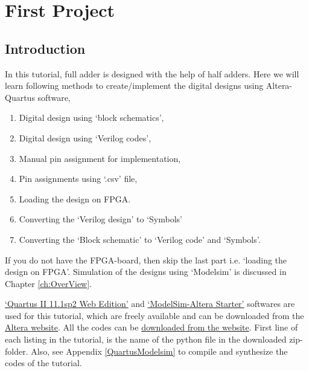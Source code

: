 \chapter{First Project} \label{ch:FirstProject}

\graphicspath{{Chapters/FirstProject/Figures/}}


\section{Introduction}
In this tutorial, full adder is designed with the help of half adders. Here we will learn following methods to create/implement the digital designs using Altera-Quartus software, 

\begin{enumerate}
	\item Digital design using `block schematics',
	\item Digital design using `Verilog codes',
	\item Manual pin assignment for implementation,
	\item Pin assignments using `.csv' file,
	\item Loading the design on FPGA. 
	\item Converting the `Verilog design' to `Symbols'
	\item Converting the `Block schematic' to `Verilog code' and `Symbols'. 
\end{enumerate}

If you do not have the FPGA-board, then skip the last part i.e. `loading the design on FPGA'. Simulation of the designs using `Modelsim' is discussed in Chapter \ref{ch:OverView}. 

\href{https://www.altera.com/downloads/software/quartus-ii-we/111sp2.html}{`Quartus II 11.1sp2 Web Edition'} and \href{https://www.altera.com/downloads/software/modelsim-starter/111.html}{`ModelSim-Altera Starter'} softwares are used for this tutorial, which are freely available and can be downloaded from the \href{https://www.altera.com/downloads/download-center.html}{Altera website}. All the codes can be \href{http://pythondsp.readthedocs.io/en/latest/pythondsp/toc.html}{downloaded from the website}. First line of each listing in the tutorial, is the name of the python file in the downloaded zip-folder. Also, see Appendix \ref{QuartusModelsim} to compile and synthesize the codes of the tutorial.

